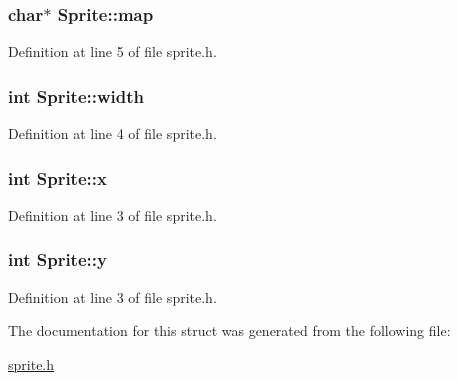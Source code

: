 \subsubsection[{map}]{\setlength{\rightskip}{0pt plus 5cm}char$\ast$ Sprite\+::map}\label{struct_sprite_a1660748aff8d6d05bfe2cffe81034dee}


Definition at line 5 of file sprite.\+h.

\hypertarget{struct_sprite_a0a3364944c5e361fc9e7ae406224d682}{}
\subsubsection[{width}]{\setlength{\rightskip}{0pt plus 5cm}int Sprite\+::width}\label{struct_sprite_a0a3364944c5e361fc9e7ae406224d682}


Definition at line 4 of file sprite.\+h.

\hypertarget{struct_sprite_ab36028dcefdd4bf024c52c8d9519a283}{}
\subsubsection[{x}]{\setlength{\rightskip}{0pt plus 5cm}int Sprite\+::x}\label{struct_sprite_ab36028dcefdd4bf024c52c8d9519a283}


Definition at line 3 of file sprite.\+h.

\hypertarget{struct_sprite_a363e26017ee2aaed8636f7dab92af2cd}{}
\subsubsection[{y}]{\setlength{\rightskip}{0pt plus 5cm}int Sprite\+::y}\label{struct_sprite_a363e26017ee2aaed8636f7dab92af2cd}


Definition at line 3 of file sprite.\+h.



The documentation for this struct was generated from the following file\+:\begin{DoxyCompactItemize}
\item 
\hyperlink{sprite_8h}{sprite.\+h}\end{DoxyCompactItemize}
